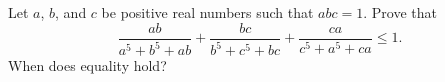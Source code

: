 Let $a$, $b$, and $c$ be positive real numbers such that $abc = 1$. Prove that
\[
\frac{ab}{a^5 + b^5 + ab} + \frac{bc}{b^5 + c^5 + bc} + \frac{ca}{c^5 + a^5 + ca} \leq 1.
\]
When does equality hold?

